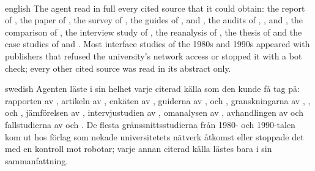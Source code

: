 \paragraph{} %
\begin{onlyin}{english} %
The agent read in full every cited source that it could obtain: the
report of
\textcite{Margono1995Study}, the paper of \textcite{Chen2007Comparing},
the
survey of \textcite{Voronkov2019System}, the guides of
\textcite{Sandve2013Ten}, \textcite{Wilson2014Best} and
\textcite{Wilson2017Good}, the audits of \textcite{Ziemann2016Gene},
\textcite{Abeysooriya2021Gene}, \textcite{Trisovic2022Large} and
\textcite{Saju2025Computational}, the comparison of
\textcite{Magar2025Data}, the interview study of
\textcite{Doyle2007Why}, the reanalysis of \textcite{Baggerly2009Deriving},
the thesis of \textcite{Nust2022Infrastructures} and the case studies of
\textcite{Skinner2019Factor} and \textcite{Colaizzi2025Algorithms}.
Most interface studies
of the 1980s and
1990s appeared with publishers that refused the university's network
access or stopped it with a bot check; every other cited source was
read in its abstract only.
\end{onlyin}
\begin{onlyin}{swedish}
Agenten läste i sin helhet varje citerad källa som den kunde få tag
på:
rapporten av \textcite{Margono1995Study}, artikeln av
\textcite{Chen2007Comparing}, enkäten av \textcite{Voronkov2019System},
guiderna av \textcite{Sandve2013Ten}, \textcite{Wilson2014Best} och
\textcite{Wilson2017Good}, granskningarna av \textcite{Ziemann2016Gene},
\textcite{Abeysooriya2021Gene}, \textcite{Trisovic2022Large} och
\textcite{Saju2025Computational}, jämförelsen av
\textcite{Magar2025Data}, intervjustudien av \textcite{Doyle2007Why},
omanalysen av \textcite{Baggerly2009Deriving}, avhandlingen av
\textcite{Nust2022Infrastructures} och fallstudierna av
\textcite{Skinner2019Factor} och \textcite{Colaizzi2025Algorithms}.  De
flesta gränssnittsstudierna från 1980-
och 1990-talen kom ut hos
förlag som nekade universitetets nätverk åtkomst eller stoppade det med
en kontroll mot robotar; varje annan citerad källa lästes bara i sin
sammanfattning.
\end{onlyin}

\section{} %
\label{sec:cli-efficiency-results}

